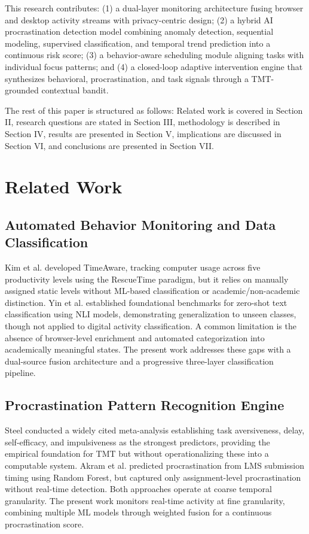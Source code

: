 \documentclass[conference]{IEEEtran}
\begin{document}
This research contributes: (1) a dual-layer monitoring architecture fusing browser and desktop activity streams with privacy-centric design; (2) a hybrid AI procrastination detection model combining anomaly detection, sequential modeling, supervised classification, and temporal trend prediction into a continuous risk score; (3) a behavior-aware scheduling module aligning tasks with individual focus patterns; and (4) a closed-loop adaptive intervention engine that synthesizes behavioral, procrastination, and task signals through a TMT-grounded contextual bandit.

The rest of this paper is structured as follows: Related work is covered in Section II, research questions are stated in Section III, methodology is described in Section IV, results are presented in Section V, implications are discussed in Section VI, and conclusions are presented in Section VII.

\section{Related Work}

\subsection{Automated Behavior Monitoring and Data Classification}
Kim et al. \cite{b10} developed TimeAware, tracking computer usage across five productivity levels using the RescueTime paradigm, but it relies on manually assigned static levels without ML-based classification or academic/non-academic distinction. Yin et al. \cite{b11} established foundational benchmarks for zero-shot text classification using NLI models, demonstrating generalization to unseen classes, though not applied to digital activity classification. A common limitation is the absence of browser-level enrichment and automated categorization into academically meaningful states. The present work addresses these gaps with a dual-source fusion architecture and a progressive three-layer classification pipeline.

\subsection{Procrastination Pattern Recognition Engine}
Steel \cite{b12} conducted a widely cited meta-analysis establishing task aversiveness, delay, self-efficacy, and impulsiveness as the strongest predictors, providing the empirical foundation for TMT but without operationalizing these into a computable system. Akram et al. \cite{b13} predicted procrastination from LMS submission timing using Random Forest, but captured only assignment-level procrastination without real-time detection. Both approaches operate at coarse temporal granularity. The present work monitors real-time activity at fine granularity, combining multiple ML models through weighted fusion for a continuous procrastination score.
\end{document}
